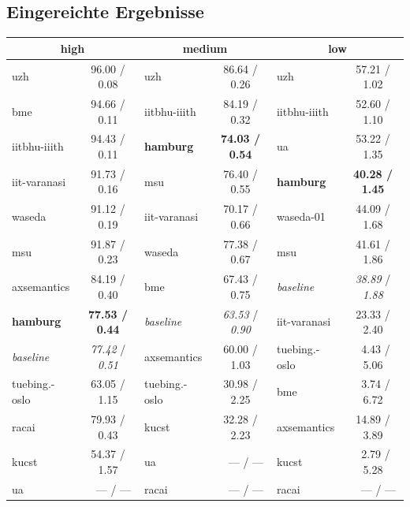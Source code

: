 \documentclass[11pt,a4paper]{article}
\begin{document}
\subsection{Eingereichte Ergebnisse}
\label{sec:eingereichte_ergebnisse}

\begin{table}[tbh]
\newcommand{\incompl}[1]{\color{gray}#1}
\newcommand{\wir}[1]{\textbf{#1}}
\newcommand{\bl}[1]{\textit{#1}}
\begin{tabular}{lc|lc|lc}
\toprule
\multicolumn{2}{c}{high}                  & \multicolumn{2}{c}{medium}                & \multicolumn{2}{c}{low}                        \\
\midrule
uzh             & 96.00 / 0.08            & uzh             & 86.64 / 0.26            & uzh                   & 57.21 / 1.02           \\
bme             & 94.66 / 0.11            & iitbhu-iiith    & 84.19 / 0.32            & iitbhu-iiith          & 52.60 / 1.10           \\
iitbhu-iiith    & 94.43 / 0.11            & \wir{hamburg}   & \wir{74.03 / 0.54}      & ua                    & 53.22 / 1.35           \\
iit-varanasi    & 91.73 / 0.16            & msu             & 76.40 / 0.55            & \wir{hamburg}         & \wir{40.28 / 1.45}     \\
waseda          & 91.12 / 0.19            & iit-varanasi    & 70.17 / 0.66            & waseda-01             & 44.09 / 1.68           \\
msu             & 91.87 / 0.23            & waseda          & 77.38 / 0.67            & msu                   & 41.61 / 1.86           \\
axsemantics     & 84.19 / 0.40            & bme             & 67.43 / 0.75            & \bl{baseline}         & \bl{38.89} / \bl{1.88} \\
\wir{hamburg}   & \wir{77.53 / 0.44}      & \bl{baseline}   & \bl{63.53} / \bl{0.90}  & iit-varanasi          & 23.33 / 2.40           \\
\bl{baseline}   & \bl{77.42} / \bl{0.51}  & axsemantics     & 60.00 / 1.03            & tuebing.-oslo        & \ 4.43 / 5.06             \\
tuebing.-oslo  & 63.05 / 1.15             & tuebing.-oslo  & 30.98 / 2.25             & bme                   & \ 3.74 / 6.72            \\
\incompl{racai} & \incompl{79.93 / 0.43}  & \incompl{kucst} & \incompl{32.28 / 2.23}  & \incompl{axsemantics} & \incompl{14.89 / 3.89} \\
\incompl{kucst} & \incompl{54.37 / 1.57}  & \incompl{ua}    & \incompl{\ \ --- / ---} & \incompl{kucst}       & \incompl{\ 2.79 / 5.28}\\
\incompl{ua}    & \incompl{\ \ --- / ---} & \incompl{racai} & \incompl{\ \ --- / ---} & \incompl{racai}       & \incompl{\ \ --- / ---}\\


\end{tabular}
\end{table}
\end{document}
